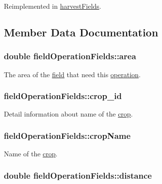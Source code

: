 Reimplemented in \hyperlink{classharvest_fields_a0aea28a5f5ab32df57a2204cce6cd04b}{harvestFields}.

\subsection{Member Data Documentation}
\hypertarget{classfield_operation_fields_a0026d9c6100052d4a1dab5ba43bdf2e0}{
\subsubsection[{area}]{\setlength{\rightskip}{0pt plus 5cm}double {\bf fieldOperationFields::area}}}
\label{classfield_operation_fields_a0026d9c6100052d4a1dab5ba43bdf2e0}


The area of the \hyperlink{classfield}{field} that need this \hyperlink{classoperation}{operation}. \hypertarget{classfield_operation_fields_a23e6b29f125bb7fefbb966eeaf8763fb}{
\subsubsection[{crop\_\-id}]{ {\bf fieldOperationFields::crop\_\-id}}}
\label{classfield_operation_fields_a23e6b29f125bb7fefbb966eeaf8763fb}


Detail information about name of the \hyperlink{classcrop}{crop}. \hypertarget{classfield_operation_fields_a2820c03f420902fdaeb3d8b5a798c444}{
\subsubsection[{cropName}]{ {\bf fieldOperationFields::cropName}}}
\label{classfield_operation_fields_a2820c03f420902fdaeb3d8b5a798c444}


Name of the \hyperlink{classcrop}{crop}. \hypertarget{classfield_operation_fields_a7bf06392f169a4392394ee8696932d8b}{
\subsubsection[{distance}]{\setlength{\rightskip}{0pt plus 5cm}double {\bf fieldOperationFields::distance}}}
\label{classfield_operation_fields_a7bf06392f169a4392394ee8696932d8b}


